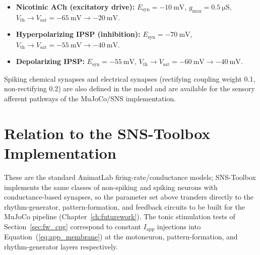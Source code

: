 \begin{itemize}
    \item \textbf{Nicotinic ACh (excitatory drive):}
          $E_{\text{syn}} = \qty{-10}{\mV}$,
          $g_{\text{max}} = \qty{0.5}{\micro\siemens}$,
          $V_{\text{th}} \to V_{\text{sat}} = \qty{-65}{\mV} \to \qty{-20}{\mV}$.
    \item \textbf{Hyperpolarizing IPSP (inhibition):}
          $E_{\text{syn}} = \qty{-70}{\mV}$,
          $V_{\text{th}} \to V_{\text{sat}} = \qty{-55}{\mV} \to \qty{-40}{\mV}$.
    \item \textbf{Depolarizing IPSP:}
          $E_{\text{syn}} = \qty{-55}{\mV}$,
          $V_{\text{th}} \to V_{\text{sat}} = \qty{-60}{\mV} \to \qty{-40}{\mV}$.
\end{itemize}

Spiking chemical synapses and electrical synapses (rectifying coupling weight
0.1, non-rectifying 0.2) are also defined in the model and are available for the
sensory afferent pathways of the MuJoCo/SNS implementation.

\section{Relation to the SNS-Toolbox Implementation}

These are the standard AnimatLab firing-rate/conductance models; SNS-Toolbox
\citep{nourse_sns_2023} implements the same classes of non-spiking and spiking
neurons with conductance-based synapses, so the parameter set above transfers
directly to the rhythm-generator, pattern-formation, and feedback circuits to be
built for the MuJoCo pipeline (Chapter~\ref{ch:futurework}). The tonic
stimulation tests of Section~\ref{sec:fw_cpg} correspond to constant
$I_{\text{app}}$ injections into Equation~(\ref{eq:app_membrane}) at the
motoneuron, pattern-formation, and rhythm-generator layers respectively.
